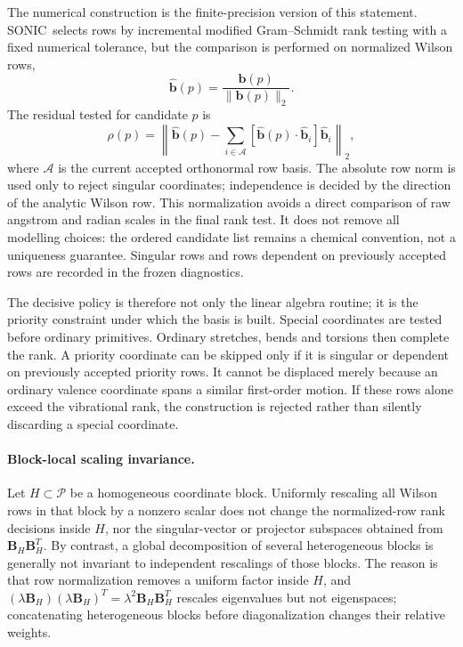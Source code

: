 \documentclass[journal=jctcce,manuscript=article,layout=traditional]{achemso}
\newcommand{\SONIC}{SONIC}
\newcommand{\Bmat}{\mathbf{B}}
\newcommand{\bmat}{\mathbf{b}}
\theoremstyle{definition}
\begin{document}
The numerical construction is the finite-precision version of this statement.  \SONIC\
selects rows by incremental modified Gram--Schmidt rank testing with a fixed
numerical tolerance, but the comparison is performed on normalized Wilson rows,
\begin{equation}
  \hat{\bmat}(p) = \frac{\bmat(p)}{\|\bmat(p)\|_2}.
\end{equation}
The residual tested for candidate \(p\) is
\begin{equation}
  \rho(p) =
  \left\|
    \hat{\bmat}(p) -
    \sum_{i \in \mathcal{A}}
    \left[\hat{\bmat}(p)\cdot \hat{\bmat}_i\right]\hat{\bmat}_i
  \right\|_2 ,
\end{equation}
where \(\mathcal{A}\) is the current accepted orthonormal row basis.  The
absolute row norm is used only to reject singular coordinates; independence is
decided by the direction of the analytic Wilson row.  This normalization avoids
a direct comparison of raw angstrom and radian scales in the final rank test.
It does not remove all modelling choices: the ordered candidate list remains a
chemical convention, not a uniqueness guarantee.  Singular rows and rows
dependent on previously accepted rows are recorded in the frozen diagnostics.

The decisive policy is therefore not only the linear algebra routine; it is the
priority constraint under which the basis is built.  Special coordinates are
tested before ordinary primitives.  Ordinary stretches, bends and torsions then
complete the rank.  A priority coordinate can be skipped only if it is singular
or dependent on previously accepted priority rows.  It cannot be displaced
merely because an ordinary valence coordinate spans a similar first-order
motion.  If these rows alone exceed the vibrational rank, the construction is
rejected rather than silently discarding a special coordinate.

\paragraph{Block-local scaling invariance.}
\label{thm:block-scaling}
Let \(H\subset\mathcal{P}\) be a homogeneous coordinate block.  Uniformly
rescaling all Wilson rows in that block by a nonzero scalar does not change the
normalized-row rank decisions inside \(H\), nor the singular-vector or projector
subspaces obtained from \(\Bmat_H\Bmat_H^T\).  By contrast, a global
decomposition of several heterogeneous blocks is generally not invariant to
independent rescalings of those blocks.
The reason is that row normalization removes a uniform factor inside \(H\), and
\((\lambda\Bmat_H)(\lambda\Bmat_H)^T=\lambda^2\Bmat_H\Bmat_H^T\) rescales
eigenvalues but not eigenspaces; concatenating heterogeneous blocks before
diagonalization changes their relative weights.
\end{document}
